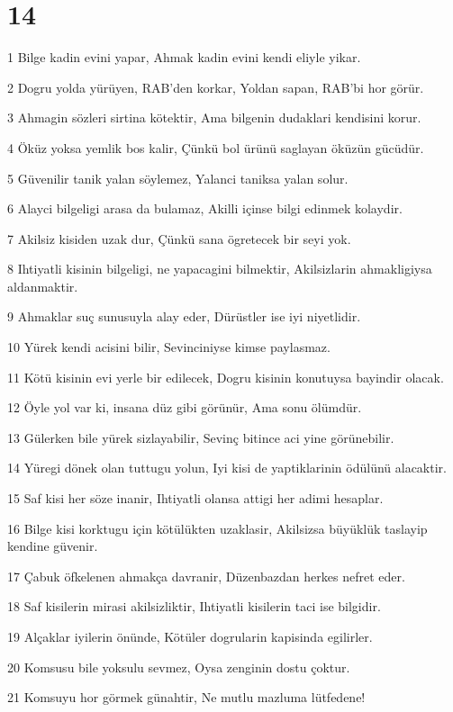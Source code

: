 \chapter{14}

\par 1 Bilge kadin evini yapar, Ahmak kadin evini kendi eliyle yikar.
\par 2 Dogru yolda yürüyen, RAB'den korkar, Yoldan sapan, RAB'bi hor görür.
\par 3 Ahmagin sözleri sirtina kötektir, Ama bilgenin dudaklari kendisini korur.
\par 4 Öküz yoksa yemlik bos kalir, Çünkü bol ürünü saglayan öküzün gücüdür.
\par 5 Güvenilir tanik yalan söylemez, Yalanci taniksa yalan solur.
\par 6 Alayci bilgeligi arasa da bulamaz, Akilli içinse bilgi edinmek kolaydir.
\par 7 Akilsiz kisiden uzak dur, Çünkü sana ögretecek bir seyi yok.
\par 8 Ihtiyatli kisinin bilgeligi, ne yapacagini bilmektir, Akilsizlarin ahmakligiysa aldanmaktir.
\par 9 Ahmaklar suç sunusuyla alay eder, Dürüstler ise iyi niyetlidir.
\par 10 Yürek kendi acisini bilir, Sevinciniyse kimse paylasmaz.
\par 11 Kötü kisinin evi yerle bir edilecek, Dogru kisinin konutuysa bayindir olacak.
\par 12 Öyle yol var ki, insana düz gibi görünür, Ama sonu ölümdür.
\par 13 Gülerken bile yürek sizlayabilir, Sevinç bitince aci yine görünebilir.
\par 14 Yüregi dönek olan tuttugu yolun, Iyi kisi de yaptiklarinin ödülünü alacaktir.
\par 15 Saf kisi her söze inanir, Ihtiyatli olansa attigi her adimi hesaplar.
\par 16 Bilge kisi korktugu için kötülükten uzaklasir, Akilsizsa büyüklük taslayip kendine güvenir.
\par 17 Çabuk öfkelenen ahmakça davranir, Düzenbazdan herkes nefret eder.
\par 18 Saf kisilerin mirasi akilsizliktir, Ihtiyatli kisilerin taci ise bilgidir.
\par 19 Alçaklar iyilerin önünde, Kötüler dogrularin kapisinda egilirler.
\par 20 Komsusu bile yoksulu sevmez, Oysa zenginin dostu çoktur.
\par 21 Komsuyu hor görmek günahtir, Ne mutlu mazluma lütfedene!
